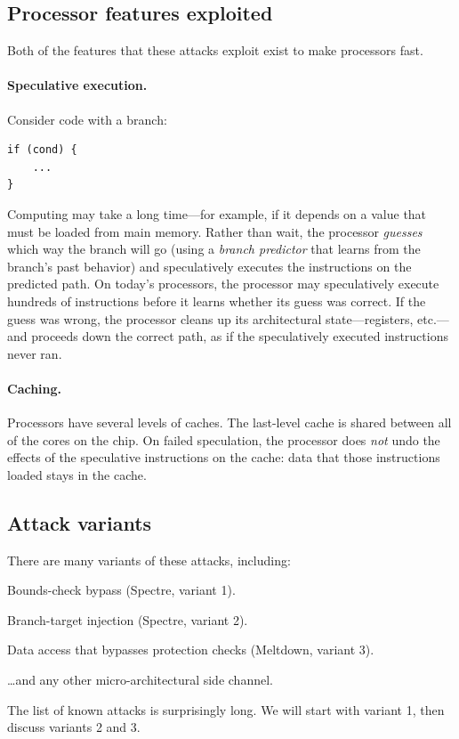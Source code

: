 \subsection{Processor features exploited}

Both of the features that these attacks exploit exist to make processors
fast.

\paragraph{Speculative execution.}
Consider code with a branch:
\begin{lstlisting}
if (cond) {
    ...
}
\end{lstlisting}
Computing  may take a long time---for example, if it depends
on a value that must be loaded from main memory.
Rather than wait, the processor \emph{guesses} which way the branch will
go (using a \emph{branch predictor} that learns from the branch's past
behavior) and speculatively executes the instructions on the predicted
path.
On today's processors, the processor may speculatively execute
hundreds of instructions before it learns whether its guess was correct.
If the guess was wrong, the processor cleans up its architectural
state---registers, etc.---and proceeds down the correct path, as if the
speculatively executed instructions never ran.

\paragraph{Caching.}
Processors have several levels of caches.
The last-level cache is shared between all of the cores on the chip.
On failed speculation, the processor does \emph{not} undo the
effects of the speculative instructions on the cache: data that those
instructions loaded stays in the cache.

\subsection{Attack variants}

There are many variants of these attacks, including:
\begin{compactenum}
  \item Bounds-check bypass (Spectre, variant 1).
  \item Branch-target injection (Spectre, variant 2).
  \item Data access that bypasses protection checks (Meltdown, variant 3).
  \item \ldots and any other micro-architectural side channel.
\end{compactenum}
The list of known attacks is surprisingly long.\autocite{behrens:mitigations}
We will start with variant 1, then discuss variants 2 and 3.

